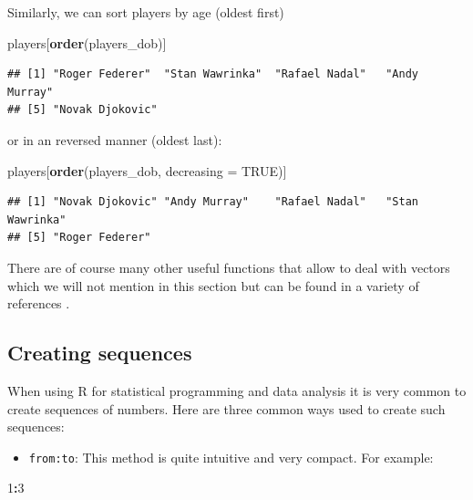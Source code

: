 \documentclass[12pt,]{krantz}
\newenvironment{Shaded}{\begin{snugshade}}{\end{snugshade}}
\newcommand{\KeywordTok}[1]{\textcolor[rgb]{0.27,0.27,0.27}{\textbf{#1}}}
\newcommand{\DataTypeTok}[1]{\textcolor[rgb]{0.27,0.27,0.27}{#1}}
\newcommand{\DecValTok}[1]{\textcolor[rgb]{0.06,0.06,0.06}{#1}}
\newcommand{\OtherTok}[1]{\textcolor[rgb]{0.37,0.37,0.37}{#1}}
\newcommand{\OperatorTok}[1]{\textcolor[rgb]{0.43,0.43,0.43}{\textbf{#1}}}
\newcommand{\NormalTok}[1]{#1}
\providecommand{\tightlist}{%
  \setlength{\itemsep}{0pt}\setlength{\parskip}{0pt}}
\begin{document}
Similarly, we can sort players by age (oldest first)

\begin{Shaded}
\begin{Highlighting}[]
\NormalTok{players[}\KeywordTok{order}\NormalTok{(players_dob)]}
\end{Highlighting}
\end{Shaded}

\begin{verbatim}
## [1] "Roger Federer"  "Stan Wawrinka"  "Rafael Nadal"   "Andy Murray"   
## [5] "Novak Djokovic"
\end{verbatim}

or in an reversed manner (oldest last):

\begin{Shaded}
\begin{Highlighting}[]
\NormalTok{players[}\KeywordTok{order}\NormalTok{(players_dob, }\DataTypeTok{decreasing =} \OtherTok{TRUE}\NormalTok{)]}
\end{Highlighting}
\end{Shaded}

\begin{verbatim}
## [1] "Novak Djokovic" "Andy Murray"    "Rafael Nadal"   "Stan Wawrinka" 
## [5] "Roger Federer"
\end{verbatim}

There are of course many other useful functions that allow to deal with
vectors which we will not mention in this section but can be found in a
variety of references \citep[see e.g.][]{wickham2014advanced}.

\subsection{Creating sequences}\label{creating-sequences}

When using R for statistical programming and data analysis it is very
common to create sequences of numbers. Here are three common ways used
to create such sequences:

\begin{itemize}
\tightlist
\item
  \texttt{from:to}: This method is quite intuitive and very compact. For
  example:
\end{itemize}

\begin{Shaded}
\begin{Highlighting}[]
\DecValTok{1}\OperatorTok{:}\DecValTok{3}
\end{Highlighting}
\end{Shaded}
\end{document}
